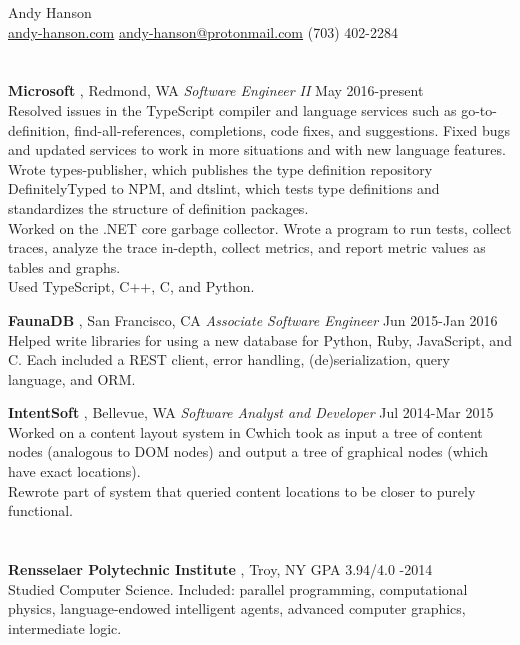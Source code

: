 \documentclass[margin]{res}
\newcommand{\sweetline}[1]{
	\setlength{\parskip}{1.5ex}
	\nointerlineskip
	\hspace{\fill}
	\resizebox{0.33\linewidth}{1.25ex}
	{
    	\begin{tikzpicture}
			\node (C) at (0,0) {};
			\node (D) at (9,0) {};
			\path (C) to [ornament=#1] (D);
		\end{tikzpicture}
	}
	\hspace{\fill}
	\par
	\nointerlineskip
}
\newcommand{\Sharp}{\nolinebreak\hspace{-.05em}\raisebox{.6ex}{\scriptsize\bf \#}}
\newcommand{\sex}[1]{\section{\fontsize{13}{13}\selectfont{#1}}}
\newcommand{\tit}[1]{{
	\fontsize{11}{12}
	\selectfont
	\textbf{#1}
}}
\begin{document}
{\centering
	\LARGE{Andy Hanson} \normalsize \\
	\url{andy-hanson.com} \quad \url{andy-hanson@protonmail.com} \quad (703) 402-2284 \\
}


\begin{resume}


\sex{work}
	\tit{Microsoft}, Redmond, WA \enspace \emph{Software Engineer II} \hfill \textsf{May 2016-present} \\
	Resolved issues in the TypeScript compiler and language services such as go-to-definition, find-all-references, completions, code fixes, and suggestions. Fixed bugs and updated services to work in more situations and with new language features. \\
	Wrote types-publisher, which publishes the type definition repository DefinitelyTyped to NPM, and dtslint, which tests type definitions and standardizes the structure of definition packages. \\
	Worked on the .NET core garbage collector. Wrote a program to run tests, collect traces, analyze the trace in-depth, collect metrics, and report metric values as tables and graphs. \\
	Used TypeScript, C++, C\Sharp, and Python.

	\tit{FaunaDB}, San Francisco, CA \enspace \emph{Associate Software Engineer} \hfill \textsf{Jun 2015-Jan 2016} \\
	Helped write libraries for using a new database for Python, Ruby, JavaScript, and C\Sharp. Each included a REST client, error handling, (de)serialization, query language, and ORM.
	
	\tit{IntentSoft}, Bellevue, WA \enspace \emph{Software Analyst and Developer} \hfill \textsf{Jul 2014-Mar 2015} \\
	Worked on a content layout system in C\Sharp which took as input a tree of content nodes (analogous to DOM nodes) and output a tree of graphical nodes (which have exact locations). \\
	Rewrote part of system that queried content locations to be closer to purely functional.

\sex{school}
	\tit{Rensselaer Polytechnic Institute}, Troy, NY \hfill \textsf{GPA 3.94/4.0 -2014} \\
	Studied Computer Science. Included: parallel programming, computational physics, language-endowed intelligent agents, advanced computer graphics, intermediate logic.
	

\end{resume}
\end{document}

